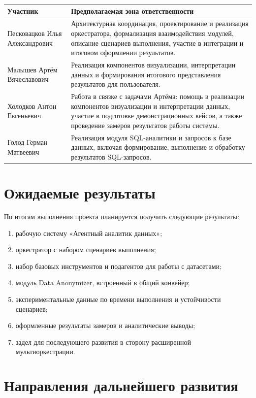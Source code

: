 \documentclass[14pt,a4paper]{extarticle}
\begin{document}
\begin{tabularx}{\textwidth}{|L{4.6cm}|Y|}
\hline
\textbf{Участник} & \textbf{Предполагаемая зона ответственности} \\
\hline
Песковацков Илья Александрович & Архитектурная координация, проектирование и реализация оркестратора, формализация взаимодействия модулей, описание сценариев выполнения, участие в интеграции и итоговом оформлении результатов. \\
\hline
Малышев Артём Вячеславович & Реализация компонентов визуализации, интерпретации данных и формирования итогового представления результатов для пользователя. \\
\hline
Холодков Антон Евгеньевич & Работа в связке с задачами Артёма: помощь в реализации компонентов визуализации и интерпретации данных, участие в подготовке демонстрационных кейсов, а также проведение замеров результатов работы системы. \\
\hline
Голод Герман Матвеевич & Реализация модуля SQL-аналитики и запросов к базе данных, включая формирование, выполнение и обработку результатов SQL-запросов. \\
\hline
\end{tabularx}

\section{Ожидаемые результаты}

По итогам выполнения проекта планируется получить следующие результаты:
\begin{enumerate}
    \item рабочую систему «Агентный аналитик данных»;
    \item оркестратор с набором сценариев выполнения;
    \item набор базовых инструментов и подагентов для работы с датасетами;
    \item модуль Data Anonymizer, встроенный в общий конвейер;
    \item экспериментальные данные по времени выполнения и устойчивости сценариев;
    \item оформленные результаты замеров и аналитические выводы;
    \item задел для последующего развития в сторону расширенной мультиоркестрации.
\end{enumerate}

\section{Направления дальнейшего развития}
\end{document}
